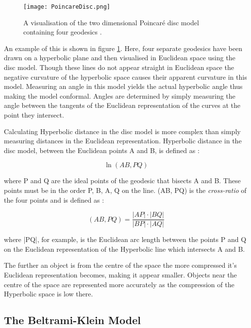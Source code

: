 \begin{figure}
	\centering
	\texttt{[image: PoincareDisc.png]}
	\caption[A visualisation of the two dimensional Poincar\'{e} disc model containing four geodesics]{A visualisation of the two dimensional Poincar\'{e} disc model containing four geodesics .}
	\label{fig:poincare_example}
\end{figure}

An example of this is shown in figure \ref{fig:poincare_example}. Here, four separate geodesics have been drawn on a hyperbolic plane and then visualised in Euclidean space using the disc model. Though these lines do not appear straight in Euclidean space the negative curvature of the hyperbolic space causes their apparent curvature in this model. Measuring an angle in this model yields the actual hyperbolic angle thus making the model conformal. Angles are determined by simply measuring the angle between the tangents of the Euclidean representation of the curves at the point they intersect.

Calculating Hyperbolic distance in the disc model is more complex than simply measuring distances in the Euclidean representation. Hyperbolic distance in the disc model, between the Euclidean points A and B, is defined as \cite{blair_inversion_2000}:

\begin{equation}
\label{distance_disc_model}
\ln(AB,PQ)
\end{equation}

where P and Q are the ideal points of the geodesic that bisects A and B. These points must be in the order P, B, A, Q on the line. (AB, PQ) is the \textit{cross-ratio} of the four points and is defined as \cite{blair_inversion_2000}:

\begin{equation}
(AB,PQ) = \frac{|AP|\cdot|BQ|}{|BP|\cdot|AQ|}
\end{equation}

where |PQ|, for example, is the Euclidean arc length between the points P and Q on the Euclidean representation of the Hyperbolic line which intersects A and B.

The further an object is from the centre of the space the more compressed it's Euclidean representation becomes, making it appear smaller. Objects near the centre of the space are represented more accurately as the compression of the Hyperbolic space is low there.

\subsection{The Beltrami-Klein Model}

